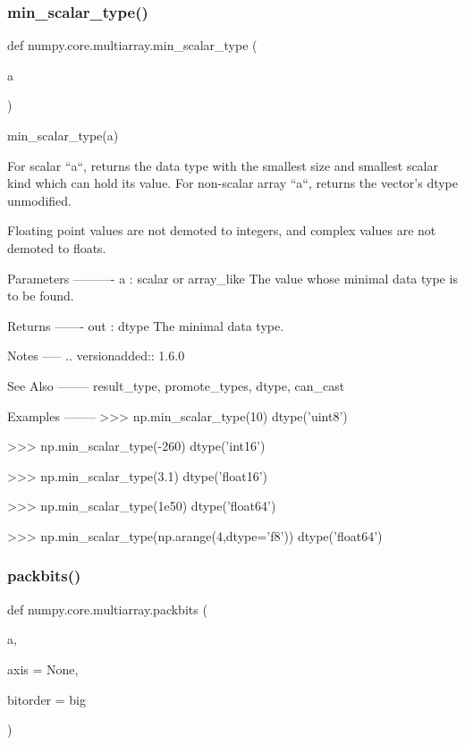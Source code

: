 \subsubsection{\texorpdfstring{min\+\_\+scalar\+\_\+type()}{min\_scalar\_type()}}
{\footnotesize\ttfamily def numpy.\+core.\+multiarray.\+min\+\_\+scalar\+\_\+type (\begin{DoxyParamCaption}\item[{}]{a }\end{DoxyParamCaption})}

\begin{DoxyVerb}min_scalar_type(a)

For scalar ``a``, returns the data type with the smallest size
and smallest scalar kind which can hold its value.  For non-scalar
array ``a``, returns the vector's dtype unmodified.

Floating point values are not demoted to integers,
and complex values are not demoted to floats.

Parameters
----------
a : scalar or array_like
    The value whose minimal data type is to be found.

Returns
-------
out : dtype
    The minimal data type.

Notes
-----
.. versionadded:: 1.6.0

See Also
--------
result_type, promote_types, dtype, can_cast

Examples
--------
>>> np.min_scalar_type(10)
dtype('uint8')

>>> np.min_scalar_type(-260)
dtype('int16')

>>> np.min_scalar_type(3.1)
dtype('float16')

>>> np.min_scalar_type(1e50)
dtype('float64')

>>> np.min_scalar_type(np.arange(4,dtype='f8'))
dtype('float64')\end{DoxyVerb}
 \mbox{\label{namespacenumpy_1_1core_1_1multiarray_abfafab2ece88862a79bce7aa911fe5c5}} 
\subsubsection{\texorpdfstring{packbits()}{packbits()}}
{\footnotesize\ttfamily def numpy.\+core.\+multiarray.\+packbits (\begin{DoxyParamCaption}\item[{}]{a,  }\item[{}]{axis = {\ttfamily None},  }\item[{}]{bitorder = {\ttfamily \textquotesingle{}big\textquotesingle{}} }\end{DoxyParamCaption})}

